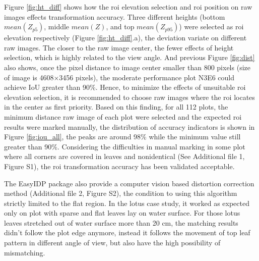 \documentclass[doublespacing]{configs/bmcart}
\begin{document}
Figure \ref{fig:ht_diff} shows how the \acrshort*{roi} elevation selection and \acrshort*{roi} position on raw images effects transformation accuracy. Three different heights (bottom $mean(Z_{p5})$, middle $mean(Z)$, and top $mean(Z_{p95})$) were selected as \acrshort*{roi} elevation respectively (Figure \ref{fig:ht_diff}.a), the deviation variate on different raw images. The closer to the raw image center, the fewer effects of height selection, which is highly related to the view angle. And previous Figure \ref{fig:dist} also shows, once the pixel distance to image center smaller than 800 pixels (size of image is 4608$\times$3456 pixels), the moderate performance plot N3E6 could achieve IoU greater than 90\%. Hence, to minimize the effects of unsuitable \acrshort*{roi} elevation selection, it is recommended to choose raw images where the \acrshort*{roi} locates in the center as first priority. Based on this finding, for all 112 plots, the minimum distance raw image of each plot were selected and the expected \acrshort*{roi} results were marked manually, the distribution of accuracy indicators is shown in Figure \ref{fig:iou_all}, the peaks are around 98\% while the minimum value still greater than 90\%. Considering the difficulties in manual marking in some plot where all corners are covered in leaves and nonidentical (See Additional file 1, Figure S1), the \acrshort*{roi} transformation accuracy has been validated acceptable.

The EasyIDP package also provide a computer vision based distortion correction method (Additional file 2, Figure S2), the condition to using this algorithm strictly limited to the flat region. In the lotus case study, it worked as expected only on plot with sparse and flat leaves lay on water surface. For those lotus leaves stretched out of water surface more than 20 cm, the matching results didn't follow the plot edge anymore, instead it follows the movement of top leaf pattern in different angle of view, but also have the high possibility of mismatching.
\end{document}
